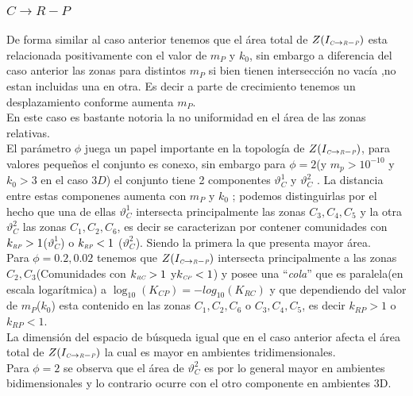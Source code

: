 \subsubsection{$C \to R-P$}
De forma similar al caso anterior tenemos que el \'area total de $Z(I_{\textit{\tiny C} \to \textit{\tiny R} - \textit{\tiny P}})$ esta relacionada positivamente con el valor de $m_P$ y $k_0$, sin embargo a diferencia del caso anterior las zonas para distintos $m_P$ si bien tienen intersecci\'on no vac\'ia ,no estan incluidas una en otra. Es decir a parte de crecimiento tenemos un desplazamiento conforme aumenta $m_P$. \\

En este caso es bastante notoria la no uniformidad en el \'area de las zonas relativas.\\

El par\'ametro $\phi$ juega un papel importante en la topolog\'ia de $Z(I_{\textit{\tiny C} \to \textit{\tiny R} - \textit{\tiny P}})$, para valores peque\~nos el conjunto es conexo, sin embargo para $\phi = 2$(y $m_p>10^{-10}$ y $k_0 > 3$ en el caso $3D$) el conjunto tiene 2 componentes $\vartheta_C^1$ y $\vartheta_C^2$ . La distancia entre estas componenes aumenta con $m_P$ y $k_0$ ; podemos distinguirlas por el hecho que una de ellas $\vartheta_C^1$ intersecta principalmente las zonas $C_3,C_4,C_5$ y la otra $\vartheta_C^2$ las zonas $C_1,C_2,C_6$, es decir se caracterizan por contener comunidades con $k_{\textit{\tiny RP}} >1 $($\vartheta_C^1$) o $k_{\textit{\tiny RP}}<1$ ($\vartheta_C^2$). Siendo la primera la que presenta mayor \'area. \\
Para $\phi = 0.2 ,0.02$  tenemos que $Z(I_{\textit{\tiny C} \to \textit{\tiny R} - \textit{\tiny P}})$ intersecta principalmente a las zonas $C_2,C_3$(Comunidades con $k_{\textit{\tiny RC}}>1$ y$k_{\textit{\tiny CP}} <1$) y posee una ``\emph{cola}'' que es paralela(en escala logar\'itmica) a $\log_{10}(K_{CP}) = -log_{10}(K_{RC})$ y que dependiendo del valor de $m_P$($k_0$) esta contenido en las zonas $C_1,C_2,C_6$ o $C_3,C_4,C_5$, es decir $k_{RP} > 1$ o $k_{RP}<1$. \\

La dimensi\'on del espacio de b\'usqueda igual que en el caso anterior afecta el \'area total de $Z(I_{\textit{\tiny C} \to \textit{\tiny R} - \textit{\tiny P}})$ la cual es mayor en ambientes tridimensionales.\\
Para $\phi = 2$ se observa que el \'area de $\vartheta_C^2$ es por lo general mayor en ambientes bidimensionales y lo contrario ocurre con el otro componente en ambientes 3D.

